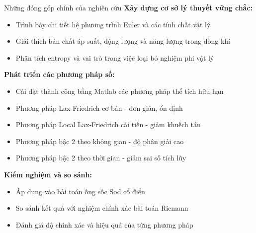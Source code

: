 \documentclass[aspectratio=43,10pt]{beamer}
\begin{document}
\begin{frame}{Những đóng góp chính của nghiên cứu}
\textbf{Xây dựng cơ sở lý thuyết vững chắc:}
\begin{itemize}
    \item Trình bày chi tiết hệ phương trình Euler và các tính chất vật lý
    \item Giải thích bản chất áp suất, động lượng và năng lượng trong dòng khí
    \item Phân tích entropy và vai trò trong việc loại bỏ nghiệm phi vật lý
\end{itemize}

\textbf{Phát triển các phương pháp số:}
\begin{itemize}
    \item Cài đặt thành công bằng Matlab các phương pháp thể tích hữu hạn
    \item Phương pháp Lax-Friedrich cơ bản - đơn giản, ổn định
    \item Phương pháp Local Lax-Friedrich cải tiến - giảm khuếch tán
    \item Phương pháp bậc 2 theo không gian - độ phân giải cao
    \item Phương pháp bậc 2 theo thời gian - giảm sai số tích lũy
\end{itemize}

\textbf{Kiểm nghiệm và so sánh:}
\begin{itemize}
    \item Áp dụng vào bài toán ống sốc Sod cổ điển
    \item So sánh kết quả với nghiệm chính xác bài toán Riemann
    \item Đánh giá độ chính xác và hiệu quả của từng phương pháp
\end{itemize}
\end{frame}
\end{document}
